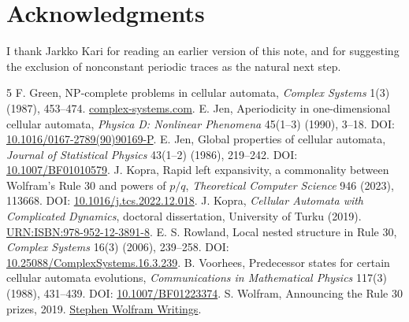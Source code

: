 \documentclass[11pt]{article}
\begin{document}
\section*{Acknowledgments}
I thank Jarkko Kari for reading an earlier version of this note, and for
suggesting the exclusion of nonconstant periodic traces as the natural next
step.

\begin{thebibliography}{5}\footnotesize
\setlength{\itemsep}{1pt}\setlength{\parskip}{0pt}
 F. Green, NP-complete problems in cellular automata,
\emph{Complex Systems} 1(3) (1987), 453--474.
\href{https://www.complex-systems.com/abstracts/v01_i03_a04/}{complex-systems.com}.
 E. Jen, Aperiodicity in one-dimensional cellular automata,
\emph{Physica D: Nonlinear Phenomena} 45(1--3) (1990), 3--18.
DOI: \href{https://doi.org/10.1016/0167-2789(90)90169-P}{10.1016/0167-2789(90)90169-P}.
 E. Jen, Global properties of cellular automata,
\emph{Journal of Statistical Physics} 43(1--2) (1986), 219--242.
DOI: \href{https://doi.org/10.1007/BF01010579}{10.1007/BF01010579}.
 J. Kopra, Rapid left expansivity, a commonality between
Wolfram's Rule 30 and powers of $p/q$, \emph{Theoretical Computer Science}
946 (2023), 113668.
DOI: \href{https://doi.org/10.1016/j.tcs.2022.12.018}{10.1016/j.tcs.2022.12.018}.
 J. Kopra, \emph{Cellular Automata with Complicated
Dynamics}, doctoral dissertation, University of Turku (2019).
\href{https://urn.fi/URN:ISBN:978-952-12-3891-8}{URN:ISBN:978-952-12-3891-8}.
 E. S. Rowland, Local nested structure in Rule 30,
\emph{Complex Systems} 16(3) (2006), 239--258.
DOI: \href{https://doi.org/10.25088/ComplexSystems.16.3.239}{10.25088/ComplexSystems.16.3.239}.
 B. Voorhees, Predecessor states for certain cellular
automata evolutions, \emph{Communications in Mathematical Physics} 117(3)
(1988), 431--439.
DOI: \href{https://doi.org/10.1007/BF01223374}{10.1007/BF01223374}.
 S. Wolfram, Announcing the Rule 30 prizes, 2019.
\href{https://writings.stephenwolfram.com/2019/10/announcing-the-rule-30-prizes/}
{Stephen Wolfram Writings}.
\end{thebibliography}
\end{document}
